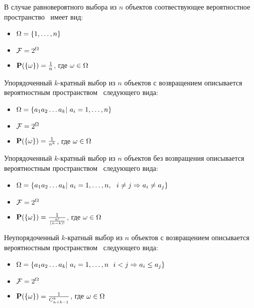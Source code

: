 \begin{example}
В случае равновероятного выбора из $n$ объектов соотвествующее вероятностное пространство \PSP~имеет вид:
\begin{itemize}
		\item $\Omega = \{1, \ldots, n\}$
		\item $\mathcal{F} = 2^{\Omega}$
		\item $\mathbf{P}(\{\omega\}) = \frac{1}{n}$, где $\omega \in \Omega$
	\end{itemize}
\end{example}

\begin{example}
Упорядоченный $k$-кратный выбор из $n$ объектов с возвращением описывается вероятностным пространством \PSP~следующего вида:
\begin{itemize}
		\item $\Omega = \{a_1a_2\ldots a_k |~a_i = 1, \ldots, n\}$
		\item $\mathcal{F} = 2^{\Omega}$
		\item $\mathbf{P}(\{\omega\}) = \frac{1}{n^k}$, где $\omega \in \Omega$
	\end{itemize}
\end{example}

\begin{example}
Упорядоченный $k$-кратный выбор из $n$ объектов без возвращения описывается вероятностным пространством \PSP~следующего вида:
\begin{itemize}
		\item $\Omega = \{a_1a_2\ldots a_k |~a_i = 1, \ldots, n,~~i \not = j \Rightarrow a_i \not = a_j \}$
		\item $\mathcal{F} = 2^{\Omega}$
		\item $\mathbf{P}(\{\omega\}) = \frac{1}{\frac{n!}{(n-k)!}}$, где $\omega \in \Omega$
	\end{itemize}
\end{example}

\begin{example}
Неупорядоченный $k$-кратный выбор из $n$ объектов с возвращением описывается вероятностным пространством \PSP~следующего вида:
\begin{itemize}
		\item $\Omega = \{a_1a_2\ldots a_k |~a_i = 1, \ldots, n~~i < j \Rightarrow a_i \le a_j \}$
		\item $\mathcal{F} = 2^{\Omega}$
		\item $\mathbf{P}(\{\omega\}) = \frac{1}{C_{n + k - 1}^k}$, где $\omega \in \Omega$
	\end{itemize}
\end{example}

